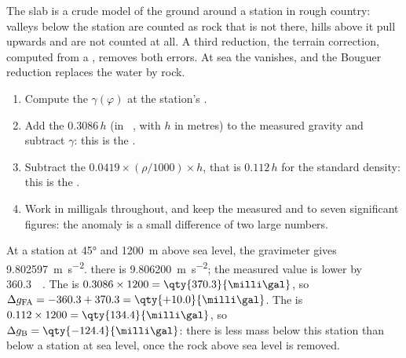 The slab is a crude model of the ground around a station in rough country:
valleys below the station are counted as rock that is not there, hills above
it pull upwards and are not counted at all. A third reduction, the terrain
correction, computed from a , removes both errors. At
sea the  vanishes, and the Bouguer reduction replaces the
water by rock.

\begin{method}\label{met:b1:isostasy-gravity:reduction}
\begin{enumerate}
  \item Compute the  $\gamma(\varphi)$ at the station's .
  \item Add the  $0.3086\,h$ (in \unit{\milli\gal}, with $h$
        in metres) to the measured gravity and subtract $\gamma$: this is the
        .
  \item Subtract the  $0.0419\times(\rho/1000)\times h$, that is
        $0.112\,h$ for the standard density: this is the .
  \item Work in milligals throughout, and keep the measured and 
        to seven significant figures: the anomaly is a small difference of two
        large numbers.
\end{enumerate}
\end{method}

\begin{example}\label{ex:b1:isostasy-gravity:reduction}
At a station at  \ang{45} and \qty{1200}{m} above sea level, the
gravimeter gives \qty{9.802597}{m.s^{-2}}.  there is
\qty{9.806200}{m.s^{-2}}; the measured value is lower by \qty{360.3}{\milli\gal}.
The  is $0.3086\times1200 = \qty{370.3}{\milli\gal}$, so
$\Delta g_{\mathrm{FA}} = -360.3 + 370.3 = \qty{+10.0}{\milli\gal}$. The  is $0.112\times1200 = \qty{134.4}{\milli\gal}$, so $\Delta g_{\mathrm B}
= \qty{-124.4}{\milli\gal}$: there is less mass below this station than below a
station at sea level, once the rock above sea level is removed.
\end{example}

